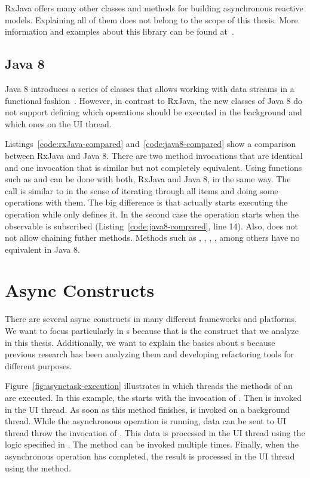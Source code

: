 \documentclass[type=bsc,accentcolor=tud9c]{tudthesis}
\newcommand{\framework}[1]{\textcolor{black!65}{#1}}
\begin{document}
\framework{RxJava} offers many other classes and methods for building asynchronous reactive models. Explaining all of them does not belong to the scope of this thesis. More information and examples about this library can be found at~\cite{bookLearningReactive}.

\subsection{Java 8}
\framework{Java 8} introduces a series of classes that allows working with data streams in a functional fashion~\cite{bookJava8Streams}. However, in contrast to \framework{RxJava}, the new classes of \framework{Java 8} do not support defining which operations should be executed in the background and which ones on the UI thread.



Listings~\ref{code:rxJava-compared} and~\ref{code:java8-compared} show a comparison between \framework{RxJava} and \framework{Java 8}. There are two method invocations that are identical and one invocation that is similar but not completely equivalent. Using functions such as  and  can be done with both, \framework{RxJava} and \framework{Java 8}, in the same way. The call  is similar to  in the sense of iterating through all items and doing some operations with them. The big difference is that  actually starts executing the operation while  only defines it. In the second case the operation starts when the observable is subscribed (Listing~\ref{code:java8-compared}, line 14). Also,  does not not allow chaining futher methods. Methods such as , , , , among others have no equivalent in \framework{Java 8}.

\section{Async Constructs}
There are several async constructs in many different frameworks and platforms. We want to focus particularly in s because that is the construct that we analyze in this thesis. Additionally, we want to explain the basics about s because previous research has been analyzing them and developing refactoring tools for different purposes.

Figure~\ref{fig:asynctask-execution} illustrates in which threads the methods of an  are executed. In this example, the  starts with the invocation of . Then  is invoked in the UI thread. As soon as this method finishes,  is invoked on a background thread. While the asynchronous operation is running, data can be sent to UI thread throw the invocation of . This data is processed in the UI thread using the logic specified in . The  method can be invoked multiple times. Finally, when the asynchronous operation has completed, the result is processed in the UI thread using the  method.
\end{document}
